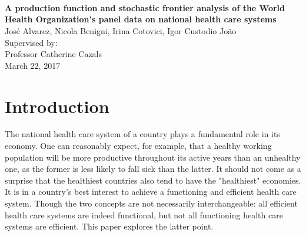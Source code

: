 \documentclass[12pt,a4paper]{article}\usepackage[]{graphicx}\usepackage[]{color}
\begin{document}



\vspace{1cm}
\begin{center}
 \\
\vspace{2cm}
 \\
\vspace{1cm}
 \\  %
\vspace{1cm}
\textbf{\Large{A production function and stochastic frontier analysis of the World Health Organization's panel data on national health care systems}} \\
\vspace{1cm}
Jos\'{e} Alvarez, Nicola Benigni, Irina Cotovici, Igor Custodio Jo\~{a}o \\
\vspace{1cm}
Supervised by: \\
Professor Catherine Cazals \\
\vspace{1cm}
March 22, 2017
\end{center}

\vfill


\newpage 
{}
\tableofcontents
\listoffigures

\newpage
\section{Introduction}

The national health care system of a country plays a fundamental role in its economy. One can reasonably expect, for example, that a healthy working population will be more productive throughout its active years than an unhealthy one, as the former is less likely to fall sick than the latter. It should not come as a surprise that the healthiest countries also tend to have the "healthiest" economies. It is in a country's best interest to achieve a functioning and efficient health care system. Though the two concepts are not necessarily interchangeable: all efficient health care systems are indeed functional, but not all functioning health care systems are efficient. This paper explores the latter point.
\end{document}
